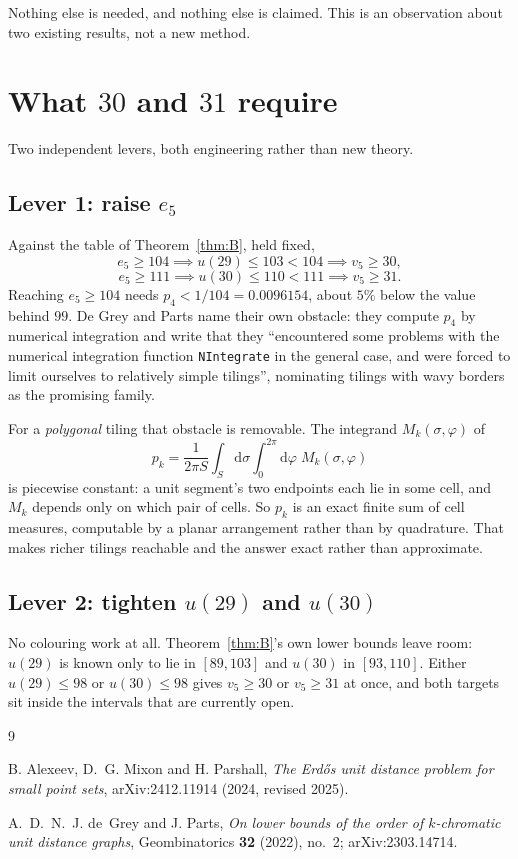 \documentclass[11pt,reqno]{amsart}
\theoremstyle{plain}
\theoremstyle{definition}
\begin{document}
Nothing else is needed, and nothing else is claimed. This is an observation about
two existing results, not a new method.

\section{What $30$ and $31$ require}

Two independent levers, both engineering rather than new theory.

\subsection*{Lever 1: raise $e_5$}
Against the table of Theorem~\ref{thm:B}, held fixed,
\[
  e_5 \ge 104 \implies u(29) \le 103 < 104 \implies v_5 \ge 30,
\]
\[
  e_5 \ge 111 \implies u(30) \le 110 < 111 \implies v_5 \ge 31.
\]
Reaching $e_5 \ge 104$ needs $p_4 < 1/104 = 0.0096154$, about $5\%$ below the
value behind $99$. De Grey and Parts name their own obstacle: they compute $p_4$
by numerical integration and write that they ``encountered some problems with the
numerical integration function \texttt{NIntegrate} in the general case, and were
forced to limit ourselves to relatively simple tilings'', nominating tilings with
wavy borders as the promising family.

For a \emph{polygonal} tiling that obstacle is removable. The integrand
$M_k(\sigma,\varphi)$ of
\[
  p_k = \frac{1}{2\pi S}\int_S \mathrm{d}\sigma \int_0^{2\pi} \mathrm{d}\varphi \;
        M_k(\sigma,\varphi)
\]
is piecewise constant: a unit segment's two endpoints each lie in some cell, and
$M_k$ depends only on which pair of cells. So $p_k$ is an exact finite sum of
cell measures, computable by a planar arrangement rather than by quadrature. That
makes richer tilings reachable and the answer exact rather than approximate.

\subsection*{Lever 2: tighten $u(29)$ and $u(30)$}
No colouring work at all. Theorem~\ref{thm:B}'s own lower bounds leave room:
$u(29)$ is known only to lie in $[89,103]$ and $u(30)$ in $[93,110]$. Either
$u(29) \le 98$ or $u(30) \le 98$ gives $v_5 \ge 30$ or $v_5 \ge 31$ at once, and
both targets sit inside the intervals that are currently open.

\begin{thebibliography}{9}

B. Alexeev, D.~G. Mixon and H. Parshall,
\emph{The Erd\H{o}s unit distance problem for small point sets},
arXiv:2412.11914 (2024, revised 2025).

A.~D.~N.~J. de~Grey and J. Parts,
\emph{On lower bounds of the order of $k$-chromatic unit distance graphs},
Geombinatorics \textbf{32} (2022), no.~2; arXiv:2303.14714.

\end{thebibliography}
\end{document}
